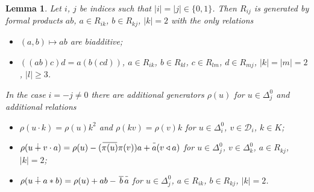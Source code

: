 \documentclass{article}
\newtheorem{lemma}{Lemma}
\theoremstyle{definition}
\newcommand{\inv}[1]{
    \!\;\overline{
        \!\!\:#1\vphantom !\!\!\:
    }\;\!
}
\begin{document}
\begin{lemma} \label{pres-ring}
    Let \(i\), \(j\) be indices such that \(|i| = |j| \in \{0, 1\}\). Then \(R_{ij}\) is generated by formal products \(ab\), \(a \in R_{ik}\), \(b \in R_{kj}\), \(|k| = 2\) with the only relations
    \begin{itemize}

        \item \(
            (a, b) \mapsto ab
        \) are biadditive;

        \item \(
            ((ab)c)d = a(b(cd))
        \), \(a \in R_{ik}\), \(b \in R_{kl}\), \(c \in R_{lm}\), \(d \in R_{mj}\), \(|k| = |m| = 2\), \(|l| \geq 3\).

    \end{itemize}
    In the case \(i = -j \neq 0\) there are additional generators \(\rho(u)\) for \(u \in \Delta^0_j\) and additional relations
    \begin{itemize}

        \item \(
            \rho(u \cdot k) = \rho(u) k^2
        \) and \(
            \rho(kv) = \rho(v) k
        \) for \(u \in \Delta^0_i\), \(v \in \mathcal D_i\), \(k \in K\);

        \item \(
            \rho(u \dotplus v \cdot a)
            =
            \rho(u)
            - (\inv{\pi(u)} \pi(v)) a
            + \inv a (v \triangleleft a)
        \) for \(u \in \Delta^0_j\), \(v \in \Delta^0_k\), \(a \in R_{kj}\), \(|k| = 2\);

        \item \(
            \rho(u \dotplus a * b)
            =
            \rho(u) + ab - \inv{\,b\,} \inv a
        \) for \(u \in \Delta^0_j\), \(a \in R_{ik}\), \(b \in R_{kj}\), \(|k| = 2\).

    \end{itemize}
\end{lemma}
\end{document}
